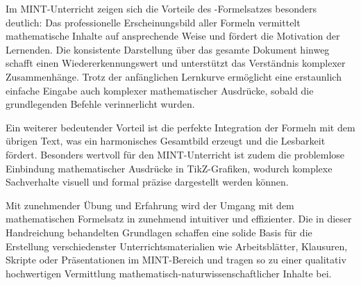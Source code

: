 \documentclass[12pt,a4paper]{article}
\begin{document}
Im MINT-Unterricht zeigen sich die Vorteile des -Formelsatzes besonders deutlich: Das professionelle Erscheinungsbild aller Formeln vermittelt mathematische Inhalte auf ansprechende Weise und fördert die Motivation der Lernenden. Die konsistente Darstellung über das gesamte Dokument hinweg schafft einen Wiedererkennungswert und unterstützt das Verständnis komplexer Zusammenhänge. Trotz der anfänglichen Lernkurve ermöglicht  eine erstaunlich einfache Eingabe auch komplexer mathematischer Ausdrücke, sobald die grundlegenden Befehle verinnerlicht wurden.

Ein weiterer bedeutender Vorteil ist die perfekte Integration der Formeln mit dem übrigen Text, was ein harmonisches Gesamtbild erzeugt und die Lesbarkeit fördert. Besonders wertvoll für den MINT-Unterricht ist zudem die problemlose Einbindung mathematischer Ausdrücke in TikZ-Grafiken, wodurch komplexe Sachverhalte visuell und formal präzise dargestellt werden können.

Mit zunehmender Übung und Erfahrung wird der Umgang mit dem mathematischen Formelsatz in  zunehmend intuitiver und effizienter. Die in dieser Handreichung behandelten Grundlagen schaffen eine solide Basis für die Erstellung verschiedenster Unterrichtsmaterialien wie Arbeitsblätter, Klausuren, Skripte oder Präsentationen im MINT-Bereich und tragen so zu einer qualitativ hochwertigen Vermittlung mathematisch-naturwissenschaftlicher Inhalte bei.
\end{document}
